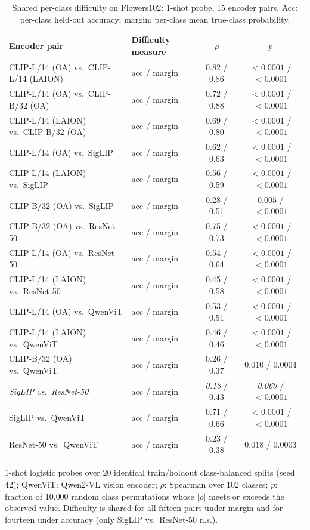 \documentclass[a4paper,fleqn]{cas-sc}
\begin{document}
\begin{table}[h]
\centering
\caption{Shared per-class difficulty on Flowers102: 1-shot probe, 15 encoder pairs. Acc: per-class held-out accuracy; margin: per-class mean true-class probability.}
\label{tab:flowers102b}
\small
\begin{tabular}{llcc}
\toprule
Encoder pair & Difficulty measure & $\rho$ & $p$ \\
\midrule
CLIP-L/14 (OA) vs.\ CLIP-L/14 (LAION) & acc / margin & 0.82 / 0.86 & $<0.0001$ / $<0.0001$ \\
CLIP-L/14 (OA) vs.\ CLIP-B/32 (OA) & acc / margin & 0.72 / 0.88 & $<0.0001$ / $<0.0001$ \\
CLIP-L/14 (LAION) vs.\ CLIP-B/32 (OA) & acc / margin & 0.69 / 0.80 & $<0.0001$ / $<0.0001$ \\
CLIP-L/14 (OA) vs.\ SigLIP & acc / margin & 0.62 / 0.63 & $<0.0001$ / $<0.0001$ \\
CLIP-L/14 (LAION) vs.\ SigLIP & acc / margin & 0.56 / 0.59 & $<0.0001$ / $<0.0001$ \\
CLIP-B/32 (OA) vs.\ SigLIP & acc / margin & 0.28 / 0.51 & $0.005$ / $<0.0001$ \\
CLIP-B/32 (OA) vs.\ ResNet-50 & acc / margin & 0.75 / 0.73 & $<0.0001$ / $<0.0001$ \\
CLIP-L/14 (OA) vs.\ ResNet-50 & acc / margin & 0.54 / 0.64 & $<0.0001$ / $<0.0001$ \\
CLIP-L/14 (LAION) vs.\ ResNet-50 & acc / margin & 0.45 / 0.58 & $<0.0001$ / $<0.0001$ \\
CLIP-L/14 (OA) vs.\ QwenViT & acc / margin & 0.53 / 0.51 & $<0.0001$ / $<0.0001$ \\
CLIP-L/14 (LAION) vs.\ QwenViT & acc / margin & 0.46 / 0.46 & $<0.0001$ / $<0.0001$ \\
CLIP-B/32 (OA) vs.\ QwenViT & acc / margin & 0.26 / 0.37 & $0.010$ / $0.0004$ \\
\textit{SigLIP vs.\ ResNet-50} & acc / margin & \textit{0.18} / 0.43 & \textit{0.069} / $<0.0001$ \\
SigLIP vs.\ QwenViT & acc / margin & 0.71 / 0.66 & $<0.0001$ / $<0.0001$ \\
ResNet-50 vs.\ QwenViT & acc / margin & 0.23 / 0.38 & $0.018$ / $0.0003$ \\
\bottomrule
\end{tabular}

\vspace{2pt}
{\footnotesize 1-shot logistic probes over 20 identical train/holdout class-balanced splits (seed 42); QwenViT: Qwen2-VL vision encoder; $\rho$: Spearman over 102 classes; $p$: fraction of 10{,}000 random class permutations whose $|\rho|$ meets or exceeds the observed value. Difficulty is shared for all fifteen pairs under margin and for fourteen under accuracy (only SigLIP vs.\ ResNet-50 n.s.).}
\end{table}
\end{document}
